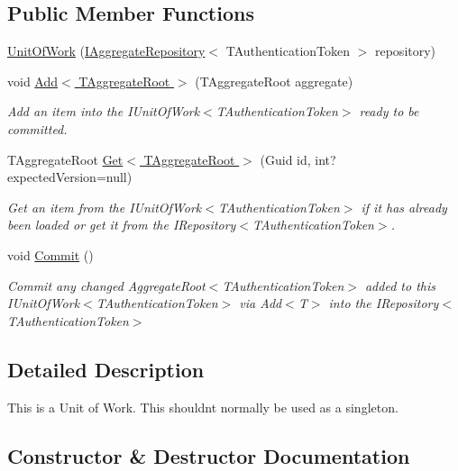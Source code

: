 \subsection*{Public Member Functions}
\begin{DoxyCompactItemize}
\item 
\hyperlink{classCqrs_1_1Domain_1_1UnitOfWork_a717facda044d5025e9d7abdec4f54acd}{Unit\+Of\+Work} (\hyperlink{interfaceCqrs_1_1Domain_1_1IAggregateRepository}{I\+Aggregate\+Repository}$<$ T\+Authentication\+Token $>$ repository)
\item 
void \hyperlink{classCqrs_1_1Domain_1_1UnitOfWork_a840214f97d3661c7b5a739df65fadc9f}{Add$<$ T\+Aggregate\+Root $>$} (T\+Aggregate\+Root aggregate)
\begin{DoxyCompactList}\small\item\em Add an item into the I\+Unit\+Of\+Work$<$\+T\+Authentication\+Token$>$ ready to be committed. \end{DoxyCompactList}\item 
T\+Aggregate\+Root \hyperlink{classCqrs_1_1Domain_1_1UnitOfWork_a1e953136c916aee711068813078aed05}{Get$<$ T\+Aggregate\+Root $>$} (Guid id, int? expected\+Version=null)
\begin{DoxyCompactList}\small\item\em Get an item from the I\+Unit\+Of\+Work$<$\+T\+Authentication\+Token$>$ if it has already been loaded or get it from the I\+Repository$<$\+T\+Authentication\+Token$>$. \end{DoxyCompactList}\item 
void \hyperlink{classCqrs_1_1Domain_1_1UnitOfWork_a7401e41dd8ce4457551c252ca6402d31}{Commit} ()
\begin{DoxyCompactList}\small\item\em Commit any changed Aggregate\+Root$<$\+T\+Authentication\+Token$>$ added to this I\+Unit\+Of\+Work$<$\+T\+Authentication\+Token$>$ via Add$<$\+T$>$ into the I\+Repository$<$\+T\+Authentication\+Token$>$ \end{DoxyCompactList}\end{DoxyCompactItemize}


\subsection{Detailed Description}
This is a Unit of Work. This shouldn\textquotesingle{}t normally be used as a singleton. 



\subsection{Constructor \& Destructor Documentation}
\mbox{\label{classCqrs_1_1Domain_1_1UnitOfWork_a717facda044d5025e9d7abdec4f54acd}} 

